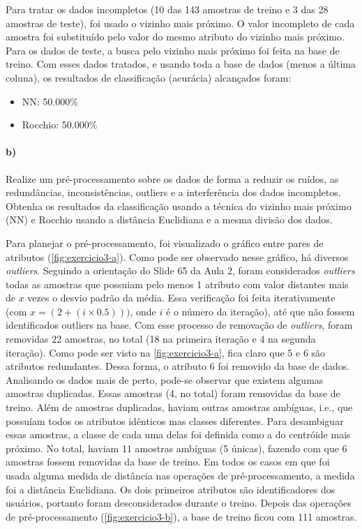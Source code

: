 \documentclass{article}
\begin{document}
Para tratar os dados incompletos (10 das 143 amostras de treino e 3 das 28 amostras de teste), foi usado o vizinho mais próximo. O valor incompleto de cada amostra foi substituído pelo valor do mesmo atributo do vizinho mais próximo. Para os dados de teste, a busca pelo vizinho mais próximo foi feita na base de treino. Com esses dados tratados, e usando toda a base de dados (menos a última coluna), os resultados de classificação (acurácia) alcançados foram:

\begin{itemize}
	\item NN: 50.000\%
	\item Rocchio: 50.000\%
\end{itemize}

\paragraph{b)} Realize um pré-processamento sobre os dados de forma a reduzir os ruídos, as redundâncias, inconsistências, outliers e a interferência dos dados incompletos. Obtenha os resultados da classificação usando a técnica do vizinho mais próximo (NN) e Rocchio usando a distância Euclidiana e a mesma divisão dos dados.

Para planejar o pré-processamento, foi visualizado o gráfico entre pares de atributos (\autoref{fig:exercicio3-a}). Como pode ser observado nesse gráfico, há diversos \textit{outliers}. Seguindo a orientação do Slide 65 da Aula 2, foram considerados \textit{outliers} todas as amostras que possuiam pelo menos 1 atributo com valor distantes mais de $x$ vezes o desvio padrão da média. Essa verificação foi feita iterativamente (com $x = (2 + (i\times0.5)))$, onde $i$ é o número da iteração), até que não fossem identificados outliers na base. Com esse processo de removação de \textit{outliers}, foram removidas 22 amostras, no total (18 na primeira iteração e 4 na segunda iteração). Como pode ser visto na \autoref{fig:exercicio3-a}, fica claro que 5 e 6 são atributos redundantes. Dessa forma, o atributo 6 foi removido da base de dados. Analisando os dados mais de perto, pode-se observar que existem algumas amostras duplicadas. Essas amostras (4, no total) foram removidas da base de treino. Além de amostras duplicadas, haviam outras amostras ambíguas, i.e., que possuíam todos os atributos idênticos mas classes diferentes. Para desambiguar essas amostras, a classe de cada uma delas foi definida como a do centróide mais próximo. No total, haviam 11 amostras ambíguas (5 únicas), fazendo com que 6 amostras fossem removidas da base de treino. Em todos os casos em que foi usada alguma medida de distância nas operações de pré-processamento, a medida foi a distância Euclidiana. Os dois primeiros atributos são identificadores dos usuários, portanto foram desconsiderados durante o treino. Depois das operações de pré-processamento (\autoref{fig:exercicio3-b}), a base de treino ficou com 111 amostras.
\end{document}
